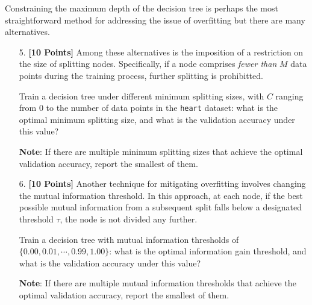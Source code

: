     Constraining the maximum depth of the decision tree is perhaps the most straightforward method for addressing the issue of overfitting but there are many alternatives. 


    \begin{enumerate}
    \item[5.] {\bf [10 Points]} Among these alternatives is the imposition of a restriction on the size of splitting nodes. Specifically, if a node comprises \textit{fewer than} $M$ data points during the training process, further splitting is prohibitted.

    Train a decision tree under different minimum splitting sizes, with $C$ ranging from $0$ to the number of data points in the \texttt{heart} dataset: what is the optimal minimum splitting size, and what is the validation accuracy under this value?

    \textbf{Note}: If there are multiple minimum splitting sizes that achieve the optimal validation accuracy, report the smallest of them.
    
    \begin{tcolorbox}[fit,height=1.5cm, width=15cm, blank, borderline={1pt}{-2pt},nobeforeafter]
    \end{tcolorbox}
    

\newpage
    \item[6.] {\bf [10 Points]} Another technique for mitigating overfitting involves changing the mutual information threshold. In this approach, at each node, if the best possible mutual information from a subsequent split falls below a designated threshold $\tau$, the node is not divided any further.

    Train a decision tree with mutual information thresholds of $\{0.00, 0.01, \cdots, 0.99, 1.00\}$: what is the optimal information gain threshold, and what is the validation accuracy under this value? 
    
    \textbf{Note}: If there are multiple mutual information thresholds that achieve the optimal validation accuracy, report the smallest of them.
    
    \begin{tcolorbox}[fit,height=1.5cm, width=15cm, blank, borderline={1pt}{-2pt},nobeforeafter]
    \end{tcolorbox}


    
\end{enumerate}

